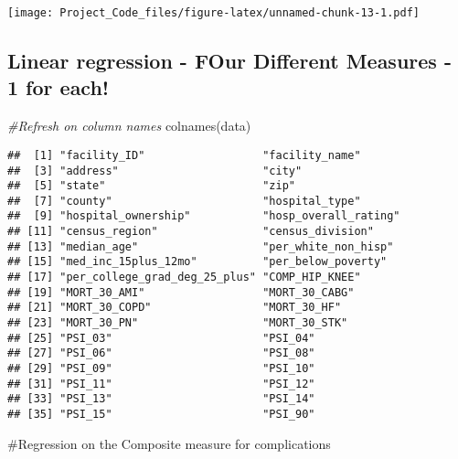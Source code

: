\documentclass[
]{article}
\newenvironment{Shaded}{\begin{snugshade}}{\end{snugshade}}
\newcommand{\CommentTok}[1]{\textcolor[rgb]{0.56,0.35,0.01}{\textit{#1}}}
\newcommand{\FunctionTok}[1]{\textcolor[rgb]{0.00,0.00,0.00}{#1}}
\newcommand{\NormalTok}[1]{#1}
\begin{document}
\texttt{[image: Project\_Code\_files/figure-latex/unnamed-chunk-13-1.pdf]}

\hypertarget{linear-regression---four-different-measures---1-for-each}{%
\subsection{Linear regression - FOur Different Measures - 1 for
each!}\label{linear-regression---four-different-measures---1-for-each}}

\begin{Shaded}
\begin{Highlighting}[]
\CommentTok{\#Refresh on column names}
\FunctionTok{colnames}\NormalTok{(data)}
\end{Highlighting}
\end{Shaded}

\begin{verbatim}
##  [1] "facility_ID"                  "facility_name"               
##  [3] "address"                      "city"                        
##  [5] "state"                        "zip"                         
##  [7] "county"                       "hospital_type"               
##  [9] "hospital_ownership"           "hosp_overall_rating"         
## [11] "census_region"                "census_division"             
## [13] "median_age"                   "per_white_non_hisp"          
## [15] "med_inc_15plus_12mo"          "per_below_poverty"           
## [17] "per_college_grad_deg_25_plus" "COMP_HIP_KNEE"               
## [19] "MORT_30_AMI"                  "MORT_30_CABG"                
## [21] "MORT_30_COPD"                 "MORT_30_HF"                  
## [23] "MORT_30_PN"                   "MORT_30_STK"                 
## [25] "PSI_03"                       "PSI_04"                      
## [27] "PSI_06"                       "PSI_08"                      
## [29] "PSI_09"                       "PSI_10"                      
## [31] "PSI_11"                       "PSI_12"                      
## [33] "PSI_13"                       "PSI_14"                      
## [35] "PSI_15"                       "PSI_90"
\end{verbatim}

\#Regression on the Composite measure for complications
\end{document}
